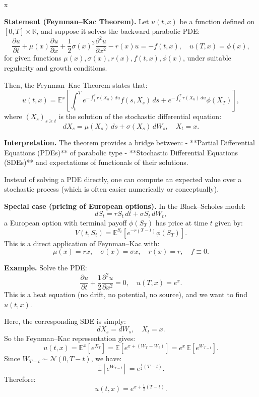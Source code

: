 x

\textbf{Statement (Feynman–Kac Theorem).}  
Let \( u(t,x) \) be a function defined on \( [0,T] \times \mathbb{R} \), and suppose it solves the backward parabolic PDE:
\[
\frac{\partial u}{\partial t} + \mu(x)\frac{\partial u}{\partial x} + \frac{1}{2}\sigma(x)^2 \frac{\partial^2 u}{\partial x^2} - r(x)u = -f(t,x), \quad u(T,x) = \phi(x),
\]
for given functions \( \mu(x), \sigma(x), r(x), f(t,x), \phi(x) \), under suitable regularity and growth conditions.

Then, the Feynman–Kac Theorem states that:
\[
u(t,x) = \mathbb{E}^{x} \left[ \int_t^T e^{-\int_t^s r(X_u)\,du} f(s, X_s)\,ds + e^{-\int_t^T r(X_u)\,du} \phi(X_T) \right],
\]
where \( (X_s)_{s\ge t} \) is the solution of the stochastic differential equation:
\[
dX_s = \mu(X_s)\,ds + \sigma(X_s)\,dW_s, \quad X_t = x.
\]

\textbf{Interpretation.}  
The theorem provides a bridge between:
- **Partial Differential Equations (PDEs)** of parabolic type
- **Stochastic Differential Equations (SDEs)** and expectations of functionals of their solutions.

Instead of solving a PDE directly, one can compute an expected value over a stochastic process (which is often easier numerically or conceptually).

\vspace{1em}
\textbf{Special case (pricing of European options).}  
In the Black–Scholes model:
\[
dS_t = r S_t\,dt + \sigma S_t\,dW_t,
\]
a European option with terminal payoff \( \phi(S_T) \) has price at time \( t \) given by:
\[
V(t, S_t) = \mathbb{E}^{S_t} \left[ e^{-r(T-t)} \phi(S_T) \right].
\]
This is a direct application of Feynman–Kac with:
\[
\mu(x) = r x, \quad \sigma(x) = \sigma x, \quad r(x) = r, \quad f \equiv 0.
\]

\textbf{Example.}  
Solve the PDE:
\[
\frac{\partial u}{\partial t} + \frac{1}{2} \frac{\partial^2 u}{\partial x^2} = 0, \quad u(T,x) = e^x.
\]
This is a heat equation (no drift, no potential, no source), and we want to find \( u(t,x) \).

Here, the corresponding SDE is simply:
\[
dX_s = dW_s, \quad X_t = x.
\]
So the Feynman–Kac representation gives:
\[
u(t,x) = \mathbb{E}^x [e^{X_T}] = \mathbb{E} [e^{x + (W_T - W_t)}] = e^x\, \mathbb{E}[e^{W_{T-t}}].
\]
Since \( W_{T-t} \sim \mathcal{N}(0, T-t) \), we have:
\[
\mathbb{E}[e^{W_{T-t}}] = e^{\frac{1}{2}(T - t)}.
\]
Therefore:
\[
u(t,x) = e^{x + \frac{1}{2}(T - t)}.
\]

